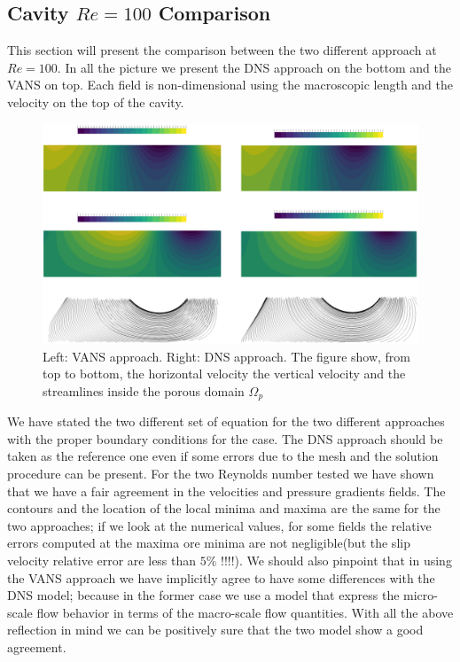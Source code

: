 \subsection{Cavity $Re=100$ Comparison}

This section will present the comparison between the two different approach at $Re=100$.
In all the picture we present the DNS approach on the bottom and the VANS on top.
Each field is non-dimensional using the macroscopic length and the velocity on the top of the cavity.

\begin{figure}[h]
	\centering
	\includegraphics[width=1\linewidth]{chapter_5/figure/re100/vans_u}
	\caption{Left: VANS approach. Right: DNS approach. The figure show, from top to bottom, the horizontal velocity the vertical velocity and the streamlines inside the porous domain $\Omega_p$}
	\label{fig:100_u}
\end{figure}

We have stated the two different set of equation for the two different approaches with the proper boundary conditions for the case.
The DNS approach should be taken as the reference one even if some errors due to the mesh and the solution procedure can be present.
For the two Reynolds number tested we have shown that we have a fair agreement in the velocities and pressure gradients fields.
The contours and the location of the local minima and maxima are the same for the two approaches; if we look at the numerical values, for some fields the relative errors computed at the maxima ore minima are not negligible(but the slip velocity relative error are less than $5\%$ !!!!).
We should also pinpoint that in using the VANS approach we have implicitly agree to have some differences with the DNS model; because in the former case we use a model that express the micro-scale flow behavior in terms of the macro-scale flow quantities.
With all the above reflection in mind we can be positively sure that the two model show a good agreement.

